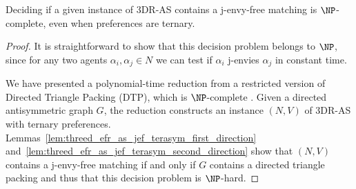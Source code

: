 \begin{thm}
\label{thm:threed_efr_as_jef_terasym_npcomplete}
Deciding if a given instance of 3DR-AS contains a j-envy-free matching is $\NP$-complete, even when preferences are ternary.
\end{thm}
\begin{proof}
It is straightforward to show that this decision problem belongs to $\NP$, since for any two agents $\alpha_i, \alpha_j \in N$ we can test if $\alpha_i$ j-envies $\alpha_j$ in constant time. 

We have presented a polynomial-time reduction from a restricted version of Directed Triangle Packing (DTP), which is $\NP$-complete \cite{CFM05}. Given a directed antisymmetric graph $G$, the reduction constructs an instance $(N, V)$ of 3DR-AS with ternary preferences. Lemmas~\ref{lem:threed_efr_as_jef_terasym_first_direction} and~\ref{lem:threed_efr_as_jef_terasym_second_direction} show that $(N, V)$ contains a j-envy-free matching if and only if $G$ contains a directed triangle packing and thus that this decision problem is $\NP$-hard.
\end{proof}